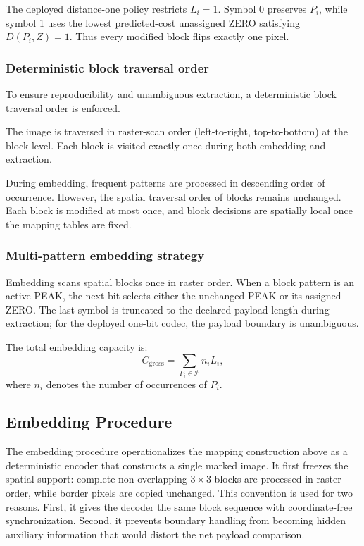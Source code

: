 \documentclass[a4paper,fleqn]{cas-dc}
\begin{document}
The deployed distance-one policy restricts $L_i=1$. Symbol 0 preserves
$P_i$, while symbol 1 uses the lowest predicted-cost unassigned ZERO satisfying
$D(P_i,Z)=1$. Thus every modified block flips exactly one pixel.

\subsubsection*{Deterministic block traversal order}
\label{subsec:order}

To ensure reproducibility and unambiguous extraction, a deterministic block traversal order is enforced.

The image is traversed in raster-scan order (left-to-right, top-to-bottom) at the block level.
Each block is visited exactly once during both embedding and extraction.

During embedding, frequent patterns are processed in descending order of occurrence.
However, the spatial traversal order of blocks remains unchanged.
Each block is modified at most once, and block decisions are spatially local
once the mapping tables are fixed.

\subsubsection*{Multi-pattern embedding strategy}
\label{subsec:multi_pattern}

Embedding scans spatial blocks once in raster order. When a block pattern is
an active PEAK, the next bit selects either the unchanged PEAK or its assigned
ZERO. The last symbol is truncated to the declared payload length during
extraction; for the deployed one-bit codec, the payload boundary is
unambiguous.

The total embedding capacity is:
\begin{equation}
C_{\text{gross}} = \sum_{P_i \in \mathcal{P}} n_i L_i,
\label{eq:gross-capacity}
\end{equation}
where $n_i$ denotes the number of occurrences of $P_i$.

\subsection{Embedding Procedure}
The embedding procedure operationalizes the mapping construction above as a
deterministic encoder that constructs a single marked image. It first freezes
the spatial support: complete non-overlapping $3\times3$ blocks are processed
in raster order, while border pixels are copied unchanged.
This convention is used for two reasons. First, it gives the decoder the same
block sequence with coordinate-free synchronization. Second, it prevents boundary
handling from becoming hidden auxiliary information that would distort the net
payload comparison.
\end{document}
